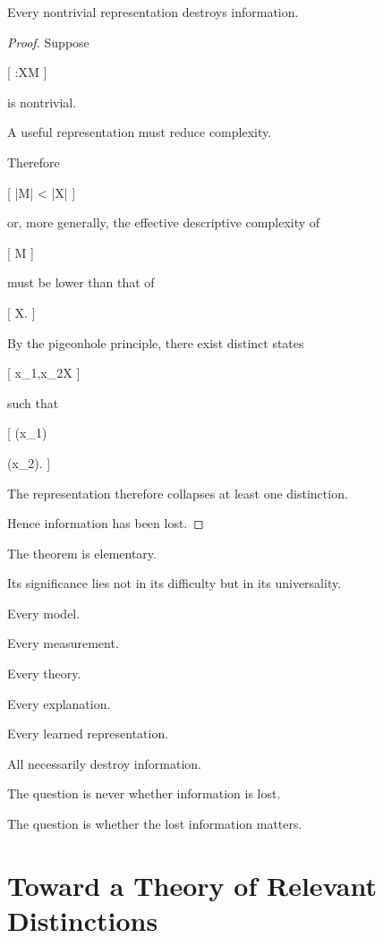 \documentclass[11pt,oneside,openany]{book}
\begin{document}
\begin{theorem}

Every nontrivial representation destroys information.

\end{theorem}

\begin{proof}

Suppose

[
\pi:\mathcal X\rightarrow\mathcal M
]

is nontrivial.

A useful representation must reduce complexity.

Therefore

[
|\mathcal M|
<
|\mathcal X|
]

or, more generally, the effective descriptive complexity of

[
\mathcal M
]

must be lower than that of

[
\mathcal X.
]

By the pigeonhole principle, there exist distinct states

[
x_1,x_2\in\mathcal X
]

such that

[
\pi(x_1)

\pi(x_2).
]

The representation therefore collapses at least one distinction.

Hence information has been lost.

\end{proof}

The theorem is elementary.

Its significance lies not in its difficulty but in its universality.

Every model.

Every measurement.

Every theory.

Every explanation.

Every learned representation.

All necessarily destroy information.

The question is never whether information is lost.

The question is whether the lost information matters.

\section{Toward a Theory of Relevant Distinctions}
\end{document}
